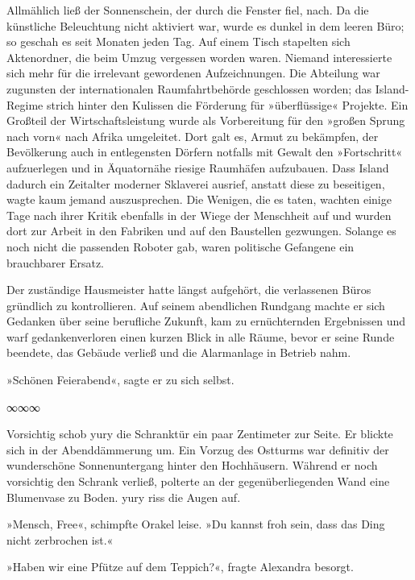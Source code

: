

Allmählich ließ der Sonnenschein, der durch die Fenster fiel, nach. Da die künstliche Beleuchtung nicht aktiviert war, wurde es dunkel in dem leeren Büro; so geschah es seit Monaten jeden Tag. Auf einem Tisch stapelten sich Aktenordner, die beim Umzug vergessen worden waren. Niemand interessierte sich mehr für die irrelevant gewordenen Aufzeichnungen. Die Abteilung war zugunsten der internationalen Raumfahrtbehörde geschlossen worden; das Island-Regime strich hinter den Kulissen die Förderung für »überflüssige« Projekte. Ein Großteil der Wirtschaftsleistung wurde als Vorbereitung für den »großen Sprung nach vorn« nach Afrika umgeleitet. Dort galt es, Armut zu bekämpfen, der Bevölkerung auch in entlegensten Dörfern notfalls mit Gewalt den »Fortschritt« aufzuerlegen und in Äquatornähe riesige Raumhäfen aufzubauen. Dass Island dadurch ein Zeitalter moderner Sklaverei ausrief, anstatt diese zu beseitigen, wagte kaum jemand auszusprechen. Die Wenigen, die es taten, wachten einige Tage nach ihrer Kritik ebenfalls in der Wiege der Menschheit auf und wurden dort zur Arbeit in den Fabriken und auf den Baustellen gezwungen. Solange es noch nicht die passenden Roboter gab, waren politische Gefangene ein brauchbarer Ersatz.

Der zuständige Hausmeister hatte längst aufgehört, die verlassenen Büros gründlich zu kontrollieren. Auf seinem abendlichen Rundgang machte er sich Gedanken über seine berufliche Zukunft, kam zu ernüchternden Ergebnissen und warf gedankenverloren einen kurzen Blick in alle Räume, bevor er seine Runde beendete, das Gebäude verließ und die Alarmanlage in Betrieb nahm.

»Schönen Feierabend«, sagte er zu sich selbst.

\begin{center}
∞∞∞
\end{center}

Vorsichtig schob yury die Schranktür ein paar Zentimeter zur Seite. Er blickte sich in der Abenddämmerung um. Ein Vorzug des Ostturms war definitiv der wunderschöne Sonnenuntergang hinter den Hochhäusern. Während er noch vorsichtig den Schrank verließ, polterte an der gegenüberliegenden Wand eine Blumenvase zu Boden. yury riss die Augen auf.

»Mensch, Free«, schimpfte Orakel leise. »Du kannst froh sein, dass das Ding nicht zerbrochen ist.«

»Haben wir eine Pfütze auf dem Teppich?«, fragte Alexandra besorgt.

